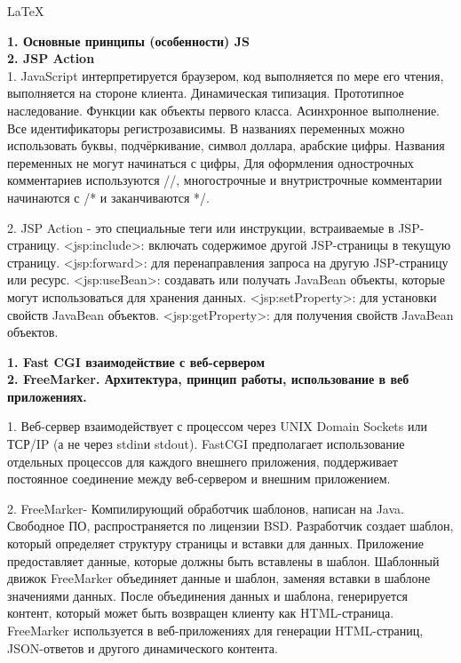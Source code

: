 \documentclass{article}
\begin{document}
\color{darkgray}
\begin{center}
    \LaTeX
\end{center}
\tiny
\begin{minipage}{.3\textwidth}
    \textbf{1. Основные принципы (особенности) JS}\\
    \textbf{2. JSP Action}\\
1. JavaScript интерпретируется браузером, код выполняется по мере его чтения, 
выполняется на стороне клиента. Динамическая типизация. Прототипное наследование. Функции как объекты первого класса. Асинхронное выполнение. Все идентификаторы регистрозависимы.
В названиях переменных можно использовать буквы, подчёркивание, символ доллара, арабские цифры.
Названия переменных не могут начинаться с цифры,
Для оформления однострочных комментариев используются //, многострочные и внутристрочные комментарии начинаются с /* и заканчиваются */.

2. JSP Action - это специальные теги или инструкции, встраиваемые в JSP-страницу.
<jsp:include>: включать содержимое другой JSP-страницы в текущую страницу. <jsp:forward>: для перенаправления запроса на другую JSP-страницу или ресурс.
<jsp:useBean>: создавать или получать JavaBean объекты, которые могут использоваться для хранения данных. <jsp:setProperty>: для установки свойств JavaBean объектов. <jsp:getProperty>: для получения свойств JavaBean объектов.
\end{minipage}
\hfill
\begin{minipage}{.3\textwidth}
    \textbf{1. Fast CGI взаимодействие с веб-сервером}\\
    \textbf{2. FreeMarker. Архитектура, принцип работы, использование в веб приложениях.}

1. Веб-сервер взаимодействует с процессом через UNIX Domain Sockets или ТСР/IP (а не через stdinи stdout).
FastCGI предполагает использование отдельных процессов для каждого внешнего приложения,
поддерживает постоянное соединение между веб-сервером и внешним приложением.

2. FreeMarker- Компилирующий обработчик шаблонов, написан на Java. Свободное ПО, распространяется по лицензии BSD.
Разработчик создает шаблон, который определяет структуру страницы и вставки для данных. Приложение предоставляет данные, которые должны быть вставлены в шаблон. 
Шаблонный движок FreeMarker объединяет данные и шаблон, заменяя вставки в шаблоне значениями данных. После объединения данных и шаблона, генерируется контент, который может быть возвращен клиенту как HTML-страница.
FreeMarker используется в веб-приложениях для генерации HTML-страниц, JSON-ответов и другого динамического контента.
\end{minipage}
\end{document}
